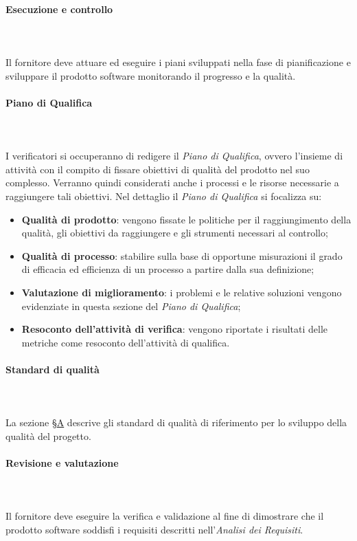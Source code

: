 			\paragraph{Esecuzione e controllo} \mbox{} \\ \mbox{} \\
Il fornitore deve attuare ed eseguire i piani sviluppati nella fase di pianificazione e sviluppare il prodotto software monitorando il progresso e la qualità.
			\paragraph*{Piano di Qualifica} \mbox{} \\ \mbox{} \\
			I verificatori si occuperanno di redigere il \textit{Piano di Qualifica}, ovvero l'insieme di attività con il compito di fissare obiettivi di qualità del prodotto nel suo complesso. Verranno quindi considerati anche i processi e le risorse necessarie a raggiungere tali obiettivi. Nel dettaglio il \textit{Piano di Qualifica} si focalizza su:
			\begin{itemize}
				\item \textbf{Qualità di prodotto}: vengono fissate le politiche per il raggiungimento della qualità, gli obiettivi da raggiungere e gli strumenti necessari al controllo;
				\item \textbf{Qualità di processo}: stabilire sulla base di opportune misurazioni il grado di efficacia ed efficienza di un processo a partire dalla sua definizione;
				\item \textbf{Valutazione di miglioramento}: i problemi e le relative soluzioni vengono evidenziate in questa sezione del \textit{Piano di Qualifica};
				\item \textbf{Resoconto dell'attività di verifica}: vengono riportate i risultati delle metriche come resoconto dell'attività di qualifica.
			\end{itemize}
			
			\paragraph*{Standard di qualità} \mbox{} \\ \mbox{} \\
			La sezione \S \hyperref[sez:standardQualita]{A} descrive gli standard di qualità di riferimento per lo sviluppo della qualità del progetto.
			
			\paragraph{Revisione e valutazione} \mbox{} \\ \mbox{} \\
			Il fornitore deve eseguire la verifica e validazione al fine di dimostrare che il prodotto software soddisfi i requisiti descritti nell'\textit{Analisi dei Requisiti}.
